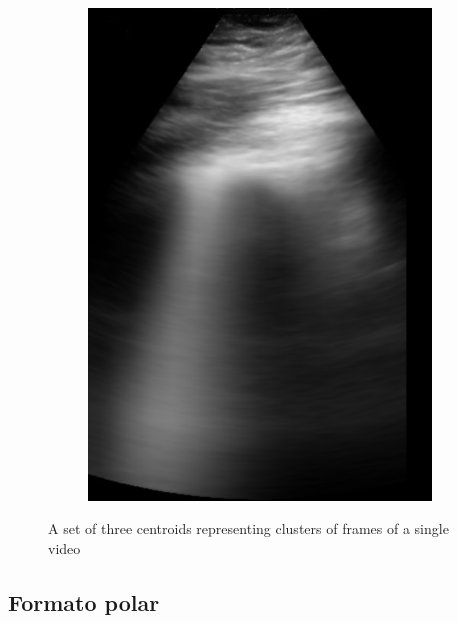 \documentclass[11pt]{article} %
\begin{document}
\begin{figure}
\begin{subfigure}{0.3\textwidth}
		\includegraphics[width=\textwidth]{figuras/centroid_2.jpg}
		\end{subfigure}
	\caption{A set of three centroids representing clusters of frames of a single 		video}
	\end{figure}
	 
\subsection{Formato polar}
\end{document}
